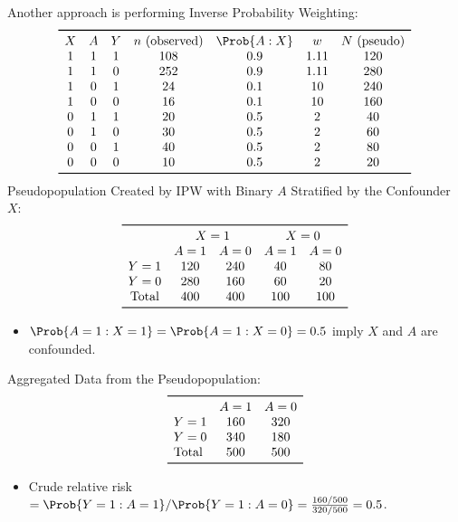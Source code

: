 \documentclass[oneside]{book}\usepackage[]{graphicx}\usepackage[svgnames]{xcolor}
\providecommand\given{} %
\renewcommand\given{\nonscript\:\delimsize\vert\nonscript\:\mathopen{}}%
\renewcommand\given{\nonscript\:\delimsize\vert\nonscript\:\mathopen{}}%
\renewcommand\given{\nonscript\:\delimsize\vert\nonscript\:\mathopen{}}%
\renewcommand\given{\nonscript\:\delimsize\vert\nonscript\:\mathopen{}}%
\renewcommand\given{\nonscript\:\delimsize\vert\nonscript\:\mathopen{}}%
\renewcommand\given{\nonscript\:\delimsize\vert\nonscript\:\mathopen{}}%
\renewcommand\given{\nonscript\:\delimsize\vert\nonscript\:\mathopen{}}%
\renewcommand\given{\nonscript\:\delimsize\vert\nonscript\:\mathopen{}}%
\renewcommand\given{\nonscript\:\delimsize\vert\nonscript\:\mathopen{}}%
\renewcommand\given{\nonscript\:\delimsize\vert\nonscript\:\mathopen{}}%
\renewcommand\given{\nonscript\:\delimsize\vert\nonscript\:\mathopen{}}%
\renewcommand\given{\nonscript\:\delimsize\vert\nonscript\:\mathopen{}}%
\renewcommand\given{\nonscript\:\delimsize\vert\nonscript\:\mathopen{}}%
\renewcommand\given{\nonscript\:\delimsize\vert\nonscript\:\mathopen{}}%
\renewcommand\given{:}
\begin{document}
Another approach is performing Inverse Probability Weighting:
\[ \begin{array}{ccccccc}
        \toprule
        X & A & Y & n~\text{(observed)} & \Prob{A\given X} & w    & N~\text{(pseudo)} \\
        1 & 1 & 1 & 108                 & 0.9              & 1.11 & 120               \\
        1 & 1 & 0 & 252                 & 0.9              & 1.11 & 280               \\
        1 & 0 & 1 & 24                  & 0.1              & 10   & 240               \\
        1 & 0 & 0 & 16                  & 0.1              & 10   & 160               \\
        0 & 1 & 1 & 20                  & 0.5              & 2    & 40                \\
        0 & 1 & 0 & 30                  & 0.5              & 2    & 60                \\
        0 & 0 & 1 & 40                  & 0.5              & 2    & 80                \\
        0 & 0 & 0 & 10                  & 0.5              & 2    & 20                \\
        \bottomrule
    \end{array} \]
Pseudopopulation Created by IPW with Binary $A$ Stratified by the
Confounder $X$:
\[ \begin{array}{ccccc}
        \toprule
                     & \multicolumn{2}{c}{X=1} & \multicolumn{2}{c}{X=0}             \\
                     & A=1                     & A=0                     & A=1 & A=0 \\
        Y=1          & 120                     & 240                     & 40  & 80  \\
        Y=0          & 280                     & 160                     & 60  & 20  \\
        \text{Total} & 400                     & 400                     & 100 & 100 \\
        \bottomrule
    \end{array} \]
\begin{itemize}
    \item $ \Prob{A=1\given X=1}= \Prob{A=1\given X=0}=0.5 $ imply $ X $ and $ A $ are confounded.
\end{itemize}
Aggregated Data from the Pseudopopulation:
\[ \begin{array}{lcc}
        \toprule
                     & A=1 & A=0 \\
        Y=1          & 160 & 320 \\
        Y=0          & 340 & 180 \\
        \text{Total} & 500 & 500 \\
        \bottomrule
    \end{array} \]
\begin{itemize}
    \item Crude relative risk $ =\Prob{Y=1\given A=1}/\Prob{Y=1\given A=0}=\frac{160/500}{320/500}=0.5 $.
\end{itemize}
\end{document}
